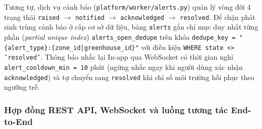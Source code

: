 Tương tự, dịch vụ cảnh báo (\texttt{platform/worker/alerts.py}) quản lý vòng đời 4 trạng thái \texttt{raised} \(\rightarrow\) \texttt{notified} \(\rightarrow\) \texttt{acknowledged} \(\rightarrow\) \texttt{resolved}. Để chặn phát sinh trùng cảnh báo ở cấp cơ sở dữ liệu, bảng \texttt{alerts} gắn chỉ mục duy nhất từng phần (\textit{partial unique index}) \texttt{alerts\_open\_dedupe} trên khóa \texttt{dedupe\_key = "\{alert\_type\}:\{zone\_id|greenhouse\_id\}"} với điều kiện \texttt{WHERE state <> 'resolved'}. Thông báo nhắc lại In-app qua WebSocket có thời gian nghỉ \texttt{alert\_cooldown\_min = 10} phút (ngừng nhắc ngay khi người dùng xác nhận \texttt{acknowledged}) và tự chuyển sang \texttt{resolved} khi chỉ số môi trường hồi phục theo ngưỡng trễ.

\subsubsection{Hợp đồng REST API, WebSocket và luồng tương tác End-to-End}

